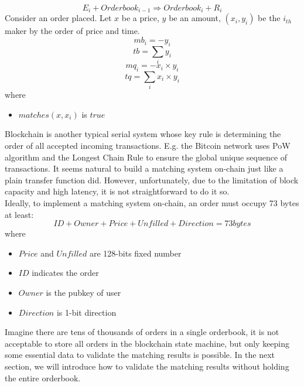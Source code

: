 \documentclass[a4paper,12pt]{article}
\begin{document}
\begin{equation*}
    E_{i} + Orderbook_{i-1} \Rightarrow Orderbook_{i} + R_{i}
\end{equation*}
Consider an order placed. Let \(x\) be a price, \(y\) be an amount,  \((x_{i}, y_{i})\) be the \(i_{th}\) maker by the order of price and time.\\
\begin{equation*}
    mb_{i}=-y_{i}
\end{equation*}
\begin{equation*}
    tb=\sum\limits_{i} y_{i}
\end{equation*}
\begin{equation*}
    mq_{i}=-x_{i} \times y_{i}
\end{equation*}
\begin{equation*}
    tq=\sum\limits_{i} x_{i} \times y_{i}
\end{equation*}
where\\
\begin{itemize}
    \item $matches(x, x_{i})$ is $true$
\end{itemize}
Blockchain is another typical serial system whose key rule is determining the order of all accepted incoming transactions. E.g. the Bitcoin network uses PoW algorithm and the Longest Chain Rule to ensure the global unique sequence of transactions. It seems natural to build a matching system on-chain just like a plain transfer function did. However, unfortunately, due to the limitation of block capacity and high latency, it is not straightforward to do it so.\\
Ideally, to implement a matching system on-chain, an order must occupy 73 bytes at least:\\
\begin{equation*}
ID + Owner + Price + Unfilled + Direction = 73 bytes
\end{equation*}
where\\
\begin{itemize}
    \item $Price$ and $Unfilled$ are 128-bits fixed number
    \item $ID$ indicates the order
    \item $Owner$ is the pubkey of user
    \item $Direction$ is 1-bit direction
\end{itemize}
Imagine there are tens of thousands of orders in a single orderbook, it is not acceptable to store all orders in the blockchain state machine, but only keeping some essential data to validate the matching results is possible. In the next section, we will introduce how to validate the matching results without holding the entire orderbook.\\
\end{document}
